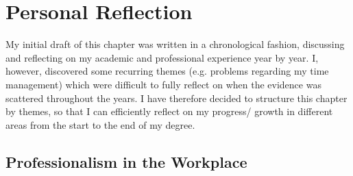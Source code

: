 \chapter{Personal Reflection} %

\label{Chapter4} %



My initial draft of this chapter was written in a chronological fashion, discussing and reflecting on my academic and professional experience year by year.
I, however, discovered some recurring themes (e.g. problems regarding my time management) which were difficult to fully reflect on when the evidence was scattered throughout the years.
I have therefore decided to structure this chapter by themes, so that I can efficiently reflect on my progress/ growth in different areas from the start to the end of my degree.



\section{Professionalism in the Workplace}

